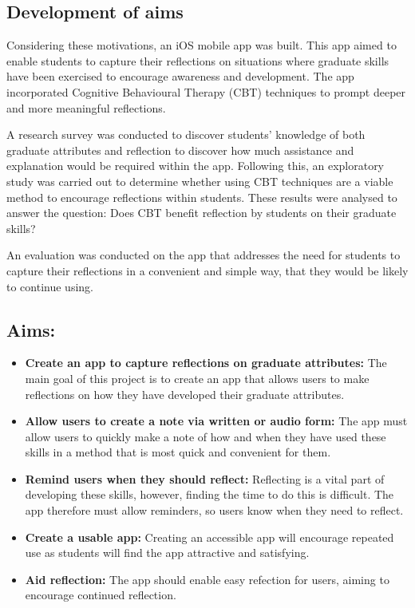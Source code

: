 \documentclass{l4proj}
\begin{document}
\subsection{Development of aims}

Considering these motivations, an iOS mobile app was built.  This app aimed to enable students to capture their reflections on situations where graduate skills have been exercised to encourage awareness and development. The app incorporated Cognitive Behavioural Therapy (CBT) techniques to prompt deeper and more meaningful reflections. 

A research survey was conducted to discover students' knowledge of both graduate attributes and reflection to discover how much assistance and explanation would be required within the app. Following this, an exploratory study was carried out to determine whether using CBT techniques are a viable method to encourage reflections within students. These results were analysed to answer the question: Does CBT benefit reflection by students on their graduate skills?

An evaluation was conducted on the app that addresses the need for students to capture their reflections in a convenient and simple way, that they would be likely to continue using.

\subsection{Aims:}

\begin{itemize}
    \item \textbf{Create an app to capture reflections on graduate attributes:} The main goal of this project is to create an app that allows users to make reflections on how they have developed their graduate attributes.
    \item \textbf{Allow users to create a note via written or audio form:} The app must allow users to quickly make a note of how and when they have used these skills in a method that is most quick and convenient for them.
    \item \textbf{Remind users when they should reflect:} Reflecting is a vital part of developing these skills, however, finding the time to do this is difficult. The app therefore must allow reminders, so users know when they need to reflect.
    \item \textbf{Create a usable app:} Creating an accessible app will encourage repeated use as students will find the app attractive and satisfying.
    \item \textbf{Aid reflection:} The app should enable easy refection for users, aiming to encourage continued reflection.
\end{itemize}
\end{document}
